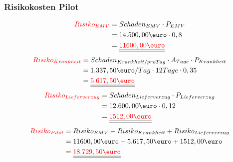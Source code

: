 \documentclass[a4paper,10pt]{scrartcl}
\begin{document}
\subsubsection{Risikokosten Pilot}
\begin{equation}
\begin{split}
\textcolor{red}{Risiko_{EMV}} &= Schaden_{EMV} \cdot P_{EMV}\\\
&= 14.500,00\text{\euro} \cdot 0,8 \\\
&= \underline{\underline{\textcolor{red}{11600,00\text{\euro}}}}
\end{split}
\end{equation}
\begin{equation}
\begin{split}
\textcolor{red}{Risiko_{Krankheit}} &= Schaden_{Krankheit/pro Tag} \cdot A_{Tage} \cdot P_{Krankheit} \\\
&= 1.337,50\text{\euro}/Tag \cdot 12 Tage \cdot 0,35\\\
&= \underline{\underline{\textcolor{red}{5.617,50\text{\euro}}}}
\end{split}
\end{equation}
\begin{equation}
\begin{split}
\textcolor{red}{Risiko_{Lieferverzug}} &= Schaden_{Lieferverzug} \cdot P_{Lieferverzug} \\\
&= 12.600,00\text{\euro} \cdot 0,12 \\\
&= \underline{\underline{\textcolor{red}{1512,00\text{\euro}}}}
\end{split}
\end{equation}
\begin{equation}
\begin{split}
\textcolor{red}{Risiko_{Pilot}} &= Risiko_{EMV} + Risiko_{Krankheit} + Risiko_{Lieferverzug} \\\
&= 11600,00\text{\euro} + 5.617,50\text{\euro} + 1512,00\text{\euro} \\\
&= \underline{\underline{\textcolor{red}{18.729,50\text{\euro}}}}
\end{split}
\end{equation}
\end{document}
